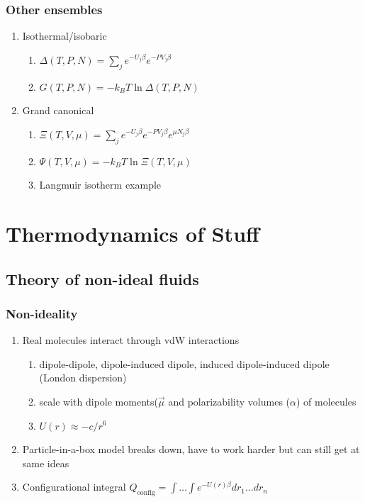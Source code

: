 \documentclass[11pt]{article}
\begin{document}
\subsubsection{Other ensembles}
\label{sec:org086bc34}
\begin{enumerate}
\item Isothermal/isobaric
\begin{enumerate}
\item \(\Delta(T,P,N) = \sum_j e^{-U_j\beta} e^{-PV_j\beta}\)
\item \(G(T,P,N) = -k_B T \ln \Delta(T,P,N)\)
\end{enumerate}
\item Grand canonical
\begin{enumerate}
\item \(\Xi(T,V,\mu) = \sum_j e^{-U_j\beta} e^{-PV_j\beta}e^{\mu N_j \beta}\)
\item \(\Psi(T,V,\mu) = - k_B T \ln \Xi(T,V,\mu)\)
\item Langmuir isotherm example
\end{enumerate}
\end{enumerate}
\section{Thermodynamics of Stuff}
\label{sec:org39be236}
\subsection{Theory of non-ideal fluids}
\label{sec:org6ae7146}
\subsubsection{Non-ideality}
\label{sec:orgde7aa9a}
\begin{enumerate}
\item Real molecules interact through vdW interactions
\begin{enumerate}
\item dipole-dipole, dipole-induced dipole, induced dipole-induced dipole
(London dispersion)
\item scale with dipole moments(\(\vec{\mu}\) and polarizability volumes
(\(\alpha\)) of molecules
\item \(U(r) \approx - c/r^6\)
\end{enumerate}
\item Particle-in-a-box model breaks down, have to work harder but
can still get at same ideas
\item Configurational integral \(Q_\mathrm{config}=\int \ldots \int e^{-U(r)\beta} dr_1\ldots dr_n\)
\end{enumerate}
\end{document}
